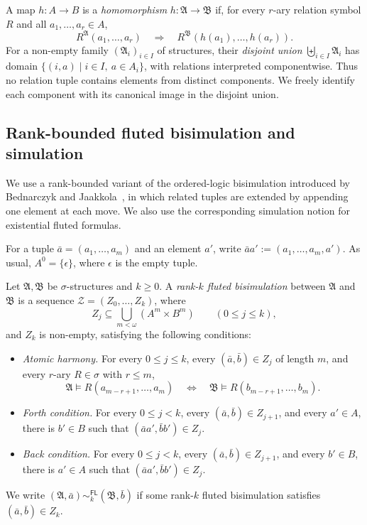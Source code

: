 \documentclass{lmcs}
\newcommand{\FL}{\mathsf{FL}}
\newcommand{\A}{\mathfrak{A}}
\newcommand{\B}{\mathfrak{B}}
\begin{document}
A map $h:A\to B$ is a \emph{homomorphism} $h:\A\to\B$ if, for every
$r$-ary relation symbol $R$ and all $a_1,\ldots,a_r\in A$,
\[
  R^{\A}(a_1,\ldots,a_r)
  \quad\Longrightarrow\quad
  R^{\B}(h(a_1),\ldots,h(a_r)).
\]
For a non-empty family $(\A_i)_{i\in I}$ of structures, their
\emph{disjoint union}
$\biguplus_{i\in I}\A_i$ has domain
$\{(i,a)\mid i\in I,\ a\in A_i\}$, with relations interpreted componentwise.
Thus no relation tuple contains elements from distinct components.  We freely
identify each component with its canonical image in the disjoint union.

\subsection{Rank-bounded fluted bisimulation and simulation}\label{subsec:model-comparison}

We use a rank-bounded variant of the ordered-logic bisimulation introduced by
Bednarczyk and
Jaakkola~\cite[Definition~2 and Lemma~3]{BednarczykJaakkola2022}, in which related
tuples are extended by appending one element at each move.  We also use the
corresponding simulation notion for existential fluted formulas.

For a tuple $\bar a=(a_1,\ldots,a_m)$ and an element $a'$, write
$\bar a a':=(a_1,\ldots,a_m,a')$.  As usual, $A^0=\{\epsilon\}$, where
$\epsilon$ is the empty tuple.

\begin{defi}\label{def:fluted-bisimulation}
Let $\A,\B$ be $\sigma$-structures and $k\geq0$.  A \emph{rank-$k$ fluted
bisimulation} between $\A$ and $\B$ is a sequence
$\mathcal Z=(Z_0,\ldots,Z_k)$, where
\[
  Z_j\subseteq\bigcup_{m<\omega}(A^m\times B^m)
  \qquad (0\leq j\leq k),
\]
and $Z_k$ is non-empty, satisfying the following conditions:
\begin{itemize}
  \item \emph{Atomic harmony.}  For every $0\leq j\leq k$, every
  $(\bar a,\bar b)\in Z_j$ of length $m$, and every $r$-ary $R\in\sigma$ with
  $r\leq m$,
  \[
    \A\models R(a_{m-r+1},\ldots,a_m)
    \quad\Longleftrightarrow\quad
    \B\models R(b_{m-r+1},\ldots,b_m).
  \]
  \item \emph{Forth condition.}  For every $0\leq j<k$, every
  $(\bar a,\bar b)\in Z_{j+1}$, and every $a'\in A$, there is $b'\in B$ such
  that $(\bar a a',\bar b b')\in Z_j$.
  \item \emph{Back condition.}  For every $0\leq j<k$, every
  $(\bar a,\bar b)\in Z_{j+1}$, and every $b'\in B$, there is $a'\in A$ such
  that $(\bar a a',\bar b b')\in Z_j$.
\end{itemize}
We write $(\A,\bar a)\sim_k^{\FL}(\B,\bar b)$ if some rank-$k$ fluted
bisimulation satisfies $(\bar a,\bar b)\in Z_k$.
\end{defi}
\end{document}

